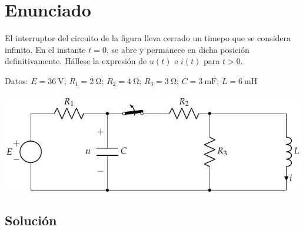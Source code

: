 \section{Enunciado}
El interruptor del circuito de la figura lleva cerrado un timepo
  que se considera infinito. En el instante $t=0$, se abre y permanece
  en dicha posición definitivamente. Hállese la expresión de $u(t)$ e
  $i(t)$ para $t>0$.

  Datos:\; $E = \qty{36}{\volt}$;\; $R_1 = \qty{2}{\ohm}$;\;
  $R_2 = \qty{4}{\ohm}$; $R_3 = \qty{3}{\ohm}$;\;
  $C = \qty{3}{\milli\farad}$; $L = \qty{6}{\milli\henry}$

\begin{center}
  \includegraphics{figuras/BT4_03.pdf}
\end{center}

\subsection*{Solución}

